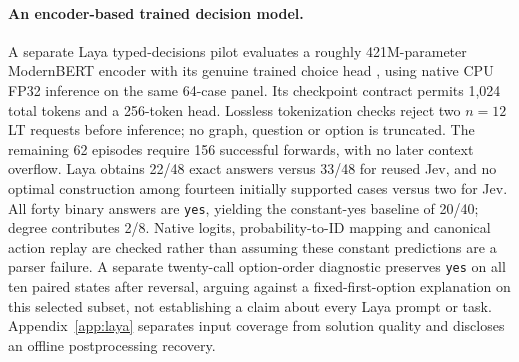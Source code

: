 \paragraph{An encoder-based trained decision model.}
A separate Laya typed-decisions pilot evaluates a roughly 421M-parameter
ModernBERT encoder with its genuine trained choice head \cite{laya2026},
using native CPU FP32 inference on the same 64-case panel.
Its checkpoint contract permits 1,024 total tokens and a 256-token head.
Lossless tokenization checks reject two $n=12$ LT requests before inference;
no graph, question or option is truncated. The remaining 62 episodes require
156 successful forwards, with no later context overflow.
Laya obtains 22/48 exact answers versus 33/48 for reused Jev, and no optimal
construction among fourteen initially supported cases versus two for Jev.
All forty binary answers are \texttt{yes}, yielding the constant-yes baseline
of 20/40; degree contributes 2/8. Native logits, probability-to-ID mapping
and canonical action replay are checked rather than assuming these constant
predictions are a parser failure. A separate twenty-call option-order
diagnostic preserves \texttt{yes} on all ten paired states after reversal,
arguing against a fixed-first-option explanation on this selected subset,
not establishing a claim about every Laya prompt or task.
Appendix~\ref{app:laya} separates input coverage from solution quality and
discloses an offline postprocessing recovery.
